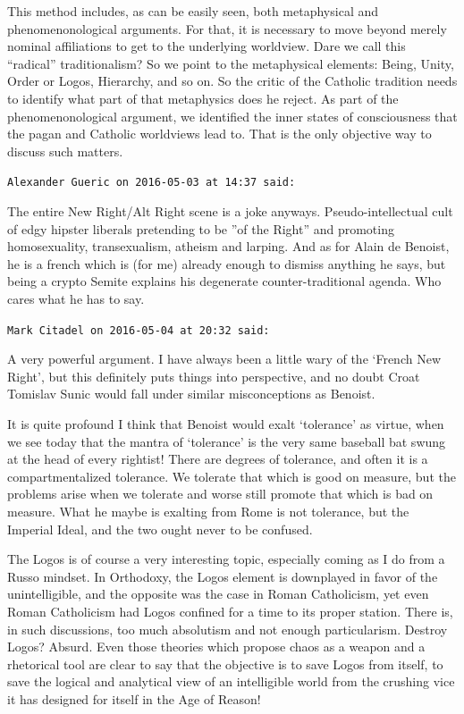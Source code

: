 \begin{footnotesize}
\begin{sffamily}
This method includes, as can be easily seen, both metaphysical and phenomenonological arguments. For that, it is necessary to move beyond merely nominal affiliations to get to the underlying worldview. Dare we call this ``radical'' traditionalism? So we point to the metaphysical elements: Being, Unity, Order or Logos, Hierarchy, and so on. So the critic of the Catholic tradition needs to identify what part of that metaphysics does he reject. As part of the phenomenonological argument, we identified the inner states of consciousness that the pagan and Catholic worldviews lead to. That is the only objective way to discuss such matters.

\hfill

\texttt{Alexander Gueric on 2016-05-03 at 14:37 said:}

The entire New Right/Alt Right scene is a joke anyways. Pseudo-intellectual cult of edgy hipster liberals pretending to be ''of the Right'' and promoting homosexuality, transexualism, atheism and larping. And as for Alain de Benoist, he is a french which is (for me) already enough to dismiss anything he says, but being a crypto Semite explains his degenerate counter-traditional agenda. Who cares what he has to say.

\hfill

\texttt{Mark Citadel on 2016-05-04 at 20:32 said:}

A very powerful argument. I have always been a little wary of the `French New Right', but this definitely puts things into perspective, and no doubt Croat Tomislav Sunic would fall under similar misconceptions as Benoist.

It is quite profound I think that Benoist would exalt `tolerance' as virtue, when we see today that the mantra of `tolerance' is the very same baseball bat swung at the head of every rightist! There are degrees of tolerance, and often it is a compartmentalized tolerance. We tolerate that which is good on measure, but the problems arise when we tolerate and worse still promote that which is bad on measure. What he maybe is exalting from Rome is not tolerance, but the Imperial Ideal, and the two ought never to be confused.

The Logos is of course a very interesting topic, especially coming as I do from a Russo mindset. In Orthodoxy, the Logos element is downplayed in favor of the unintelligible, and the opposite was the case in Roman Catholicism, yet even Roman Catholicism had Logos confined for a time to its proper station. There is, in such discussions, too much absolutism and not enough particularism. Destroy Logos? Absurd. Even those theories which propose chaos as a weapon and a rhetorical tool are clear to say that the objective is to save Logos from itself, to save the logical and analytical view of an intelligible world from the crushing vice it has designed for itself in the Age of Reason!


\end{sffamily}
\end{footnotesize}
